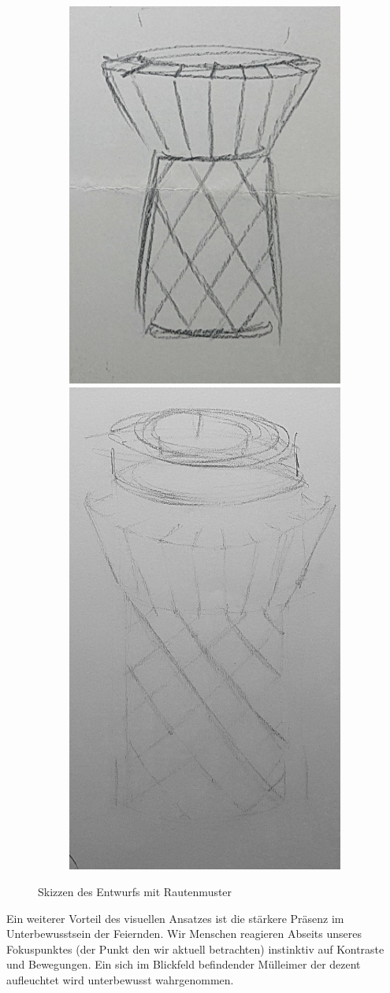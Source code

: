     \begin{figure}[H]
        \centering
        \begin{subfigure}[b]{\textwidth}
            \centering
            \includegraphics[width=0.32\linewidth]{media/01_project/pencil_sketch_bin_2.jpg}
            \hspace{1cm}
            \includegraphics[width=0.32\linewidth]{media/01_project/pencil_sketch_bin_3.jpg}
        \end{subfigure}
        \caption{Skizzen des Entwurfs mit Rautenmuster}
        \label{fig:pencil_bin_2}
    \end{figure}

    Ein weiterer Vorteil des visuellen Ansatzes ist die stärkere Präsenz im Unterbewusstsein der Feiernden. Wir Menschen reagieren Abseits unseres Fokuspunktes (der Punkt den wir aktuell betrachten) instinktiv auf Kontraste und Bewegungen. Ein sich im Blickfeld befindender Mülleimer der dezent aufleuchtet wird unterbewusst wahrgenommen.

